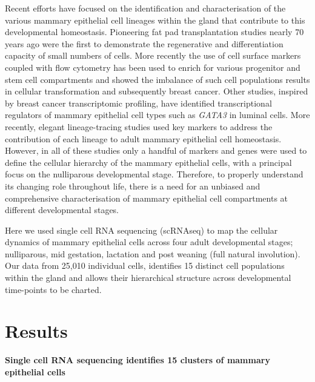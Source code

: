 \documentclass[titlepage, 12pt, oneside]{amsart}
\begin{document}
Recent efforts have focused on the identification and characterisation of the various mammary epithelial cell lineages within the gland that contribute to this developmental homeostasis.
Pioneering fat pad transplantation studies nearly 70 years ago were the first to demonstrate the regenerative and differentiation capacity of small numbers of cells\autocite{Faulkin1960,Daniel197,Smalley1998}.
More recently the use of cell surface markers coupled with flow cytometry has been used to enrich for various progenitor and stem cell compartments\autocite{Smalley1998,Stingl2006,Shackleton2006,Asselin2007} and showed the imbalance of such cell populations results in cellular transformation and subsequently breast cancer\autocite{Lim2009,Molyneux2010}.
Other studies, inspired by breast cancer transcriptomic profiling, have identified transcriptional regulators of mammary epithelial cell types such as \textit{GATA3} in luminal cells\autocite{Asselin2007,Kouros2006}.
More recently, elegant lineage-tracing studies used key markers to address the contribution of each lineage to adult mammary epithelial cell homeostasis\autocite{Inman2015}.
However, in all of these studies only a handful of markers and genes were used to define the cellular hierarchy of the mammary epithelial cells, with a principal focus on the nulliparous developmental stage.
Therefore, to properly understand its changing role throughout life, there is a need for an unbiased and comprehensive characterisation of mammary epithelial cell compartments at different developmental stages.

Here we used single cell RNA sequencing (scRNAseq) to map the cellular dynamics of mammary epithelial cells across four adult developmental stages; nulliparous, mid gestation, lactation and post weaning (full natural involution).
Our data from 25,010 individual cells, identifies 15 distinct cell populations within the gland and allows their hierarchical structure across developmental time-points to be charted.

\section{Results}

\textbf{Single cell RNA sequencing identifies 15 clusters of mammary epithelial cells}
\end{document}

